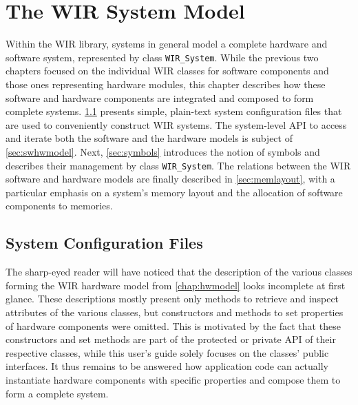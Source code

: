 \chapter{The WIR System Model}
\label{chap:sysmodel}
\renewcommand{\sectiontitle}{}

Within the \gls{WIR} library, systems in general model a complete hardware and software system, represented by class \texttt{WIR\_System}.
While the previous two chapters focused on the individual \gls{WIR} classes for software components and those ones representing hardware modules, this chapter describes how these software and hardware components are integrated and composed to form complete systems.
\cref{sec:sysconfig} presents simple, plain-text system configuration files that are used to conveniently construct \gls{WIR} systems.
The system-level \gls{API} to access and iterate both the software and the hardware models is subject of \cref{sec:swhwmodel}.
Next, \cref{sec:symbols} introduces the notion of symbols and describes their management by class \texttt{WIR\_System}.
The relations between the \gls{WIR} software and hardware models are finally described in \cref{sec:memlayout}, with a particular emphasis on a system's memory layout and the allocation of software components to memories.


\section{System Configuration Files}
\label{sec:sysconfig}

The sharp-eyed reader will have noticed that the description of the various classes forming the \gls{WIR} hardware model from \cref{chap:hwmodel} looks incomplete at first glance.
These descriptions mostly present only methods to retrieve and inspect attributes of the various classes, but constructors and methods to set properties of hardware components were omitted.
This is motivated by the fact that these constructors and set methods are part of the protected or private \gls{API} of their respective classes, while this user's guide solely focuses on the classes' public interfaces.
It thus remains to be answered how application code can actually instantiate hardware components with specific properties and compose them to form a complete system.

